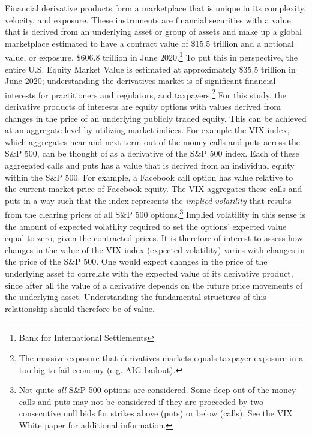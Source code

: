 \documentclass[11pt,a4paper,oldfontcommands]{memoir}
\begin{document}
Financial derivative products form a marketplace that is unique in its complexity, velocity, and exposure. These instruments are financial securities with a value that is derived from an underlying asset or group of assets and make up a global marketplace estimated to have a contract value of \$15.5 trillion and a notional value, or exposure, \$606.8 trillion in June 2020.\footnote{Bank for International Settlements} To put this in perspective, the entire U.S. Equity Market Value is estimated at approximately \$35.5 trillion in June 2020; understanding the derivatives market is of significant financial interests for practitioners and regulators, and taxpayers.\footnote{The massive exposure that derivatives markets equals taxpayer exposure in a too-big-to-fail economy (e.g. AIG bailout).} For this study, the derivative products of interests are equity options with values derived from changes in the price of an underlying publicly traded equity. This can be achieved at an aggregate level by utilizing market indices. For example the VIX index, which aggregates near and next term out-of-the-money calls and puts across the S\&P 500, can be thought of as a derivative of the S\&P 500 index. Each of these aggregated calls and puts has a value that is derived from an individual equity within the S\&P 500. For example, a Facebook call option has value relative to the current market price of Facebook equity. The VIX aggregates these calls and puts in a way such that the index represents the \textit{implied volatility} that results from the clearing prices of all S\&P 500 options.\footnote{Not quite \textit{all} S\&P 500 options are considered. Some deep out-of-the-money calls and puts may not be considered if they are proceeded by two consecutive null bids for strikes above (puts) or below (calls). See the VIX White paper for additional information.} Implied volatility in this sense is the amount of expected volatility required to set the options' expected value equal to zero, given the contracted prices. It is therefore of interest to assess how changes in the value of the VIX index (expected volatility) varies with changes in the price of the S\&P 500. One would expect changes in the price of the underlying asset to correlate with the expected value of its derivative product, since after all the value of a derivative depends on the future price movements of the underlying asset. Understanding the fundamental structures of this relationship should therefore be of value. 
\end{document}
